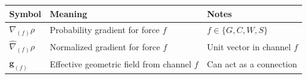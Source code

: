 \begin{table}[h!]
\vspace{1em}

\begin{tabular}{lll}
\hline
\textbf{Symbol} & \textbf{Meaning} & \textbf{Notes} \\
\hline
$\nabla_{(f)} \rho$ & Probability gradient for force $f$ & $f \in \{G,C,W,S\}$ \\
$\hat{\nabla}_{(f)} \rho$ & Normalized gradient for force $f$ & Unit vector in channel $f$ \\
$\mathbf{g}_{(f)}$ & Effective geometric field from channel $f$ & Can act as a connection \\
\hline
\end{tabular}

\end{table}

